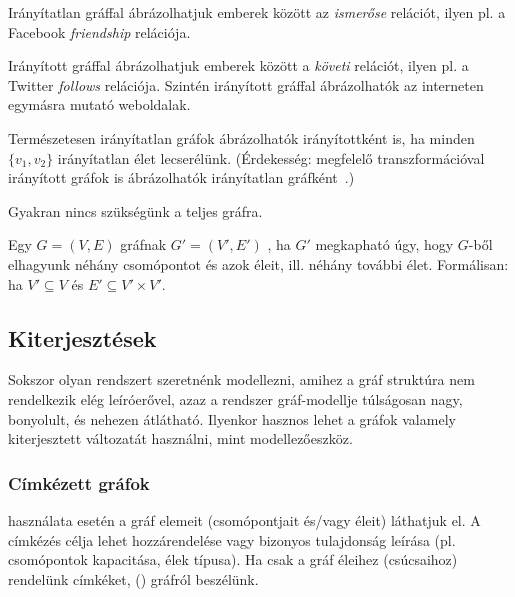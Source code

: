 \begin{pelda}
Irányítatlan gráffal ábrázolhatjuk emberek között az \emph{ismerőse} relációt, ilyen pl. a Facebook \emph{friendship} relációja.
\end{pelda}

\begin{pelda}
Irányított gráffal ábrázolhatjuk emberek között a \emph{követi} relációt, ilyen pl. a Twitter \emph{follows} relációja. Szintén irányított gráffal ábrázolhatók az interneten egymásra mutató weboldalak.
\end{pelda}

Természetesen irányítatlan gráfok ábrázolhatók irányítottként is, ha minden $\{v_1, v_2\}$ irányítatlan élet lecserélünk. (Érdekesség: megfelelő transzformációval irányított gráfok is ábrázolhatók irányítatlan gráfként~\cite{rodriguez2008mapping}.)

Gyakran nincs szükségünk a teljes gráfra.

\begin{definicio}
Egy $G = (V, E)$ gráfnak $G' = (V', E')$ , ha $G'$ megkapható úgy, hogy $G$-ből elhagyunk néhány csomópontot és azok éleit, ill. néhány további élet. Formálisan: ha $V' \subseteq V$ és $E' \subseteq V' \times V'$.
\end{definicio}	

\subsection{Kiterjesztések}

Sokszor olyan rendszert szeretnénk modellezni, amihez a gráf struktúra nem rendelkezik elég leíróerővel, azaz a rendszer gráf-modellje túlságosan nagy, bonyolult, és nehezen átlátható. Ilyenkor hasznos lehet a gráfok valamely kiterjesztett változatát használni, mint modellezőeszköz.

\subsubsection{Címkézett gráfok}

 használata esetén a gráf elemeit (csomópontjait és/vagy éleit)  láthatjuk el. A címkézés célja lehet  hozzárendelése vagy bizonyos tulajdonság leírása (pl. csomópontok kapacitása, élek típusa).
Ha csak a gráf éleihez (csúcsaihoz) rendelünk címkéket,  () gráfról beszélünk.

